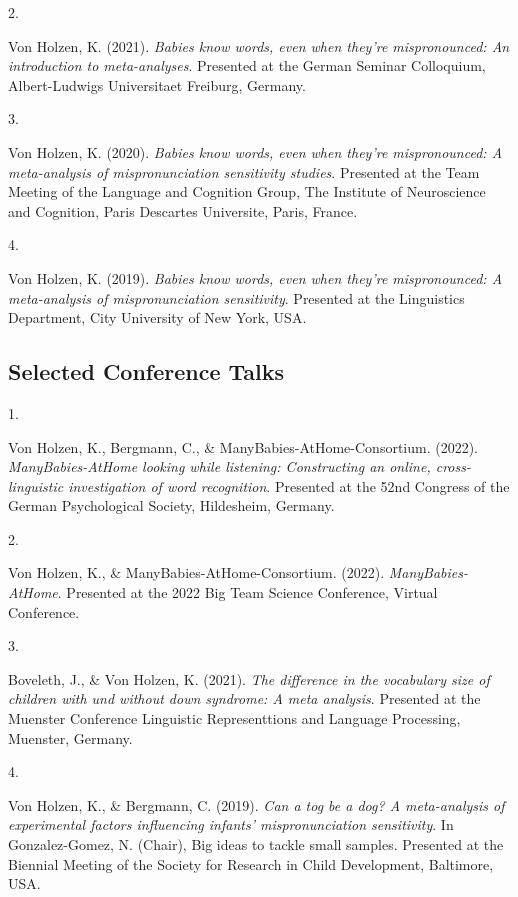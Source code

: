 \documentclass[10pt,a4paper,]{article}
\newlength{\cslhangindent}
\newlength{\csllabelwidth}
\newcommand{\CSLLeftMargin}[1]{\parbox[t]{\csllabelwidth}{\hfill #1~}}
\newcommand{\CSLRightInline}[1]{\parbox[t]{\linewidth - \cslhangindent - \csllabelwidth}{#1}\vspace{0.8ex}}
\begin{document}
\leavevmode{}%
\CSLLeftMargin{2. }%
\CSLRightInline{Von Holzen, K. (2021). \emph{Babies know words, even
when they're mispronounced: An introduction to meta-analyses}. Presented
at the German Seminar Colloquium, Albert-Ludwigs Universitaet Freiburg,
Germany.}

\leavevmode{}%
\CSLLeftMargin{3. }%
\CSLRightInline{Von Holzen, K. (2020). \emph{Babies know words, even
when they're mispronounced: A meta-analysis of mispronunciation
sensitivity studies}. Presented at the Team Meeting of the Language and
Cognition Group, The Institute of Neuroscience and Cognition, Paris
Descartes Universite, Paris, France.}

\leavevmode{}%
\CSLLeftMargin{4. }%
\CSLRightInline{Von Holzen, K. (2019). \emph{Babies know words, even
when they're mispronounced: A meta-analysis of mispronunciation
sensitivity}. Presented at the Linguistics Department, City University
of New York, USA.}

\hypertarget{selected-conference-talks}{%
\subsection{Selected Conference Talks}\label{selected-conference-talks}}

\hypertarget{bibliography}{}
\leavevmode{}%
\CSLLeftMargin{1. }%
\CSLRightInline{Von Holzen, K., Bergmann, C., \&
ManyBabies-AtHome-Consortium. (2022). \emph{ManyBabies-AtHome looking
while listening: Constructing an online, cross-linguistic investigation
of word recognition}. Presented at the 52nd Congress of the German
Psychological Society, Hildesheim, Germany.}

\leavevmode{}%
\CSLLeftMargin{2. }%
\CSLRightInline{Von Holzen, K., \& ManyBabies-AtHome-Consortium. (2022).
\emph{ManyBabies-AtHome}. Presented at the 2022 Big Team Science
Conference, Virtual Conference.}

\leavevmode{}%
\CSLLeftMargin{3. }%
\CSLRightInline{Boveleth, J., \& Von Holzen, K. (2021). \emph{The
difference in the vocabulary size of children with und without down
syndrome: A meta analysis}. Presented at the Muenster Conference
Linguistic Representtions and Language Processing, Muenster, Germany.}

\leavevmode{}%
\CSLLeftMargin{4. }%
\CSLRightInline{Von Holzen, K., \& Bergmann, C. (2019). \emph{Can a tog
be a dog? A meta-analysis of experimental factors influencing infants'
mispronunciation sensitivity}. In Gonzalez-Gomez, N. (Chair), Big ideas
to tackle small samples. Presented at the Biennial Meeting of the
Society for Research in Child Development, Baltimore, USA.}
\end{document}
